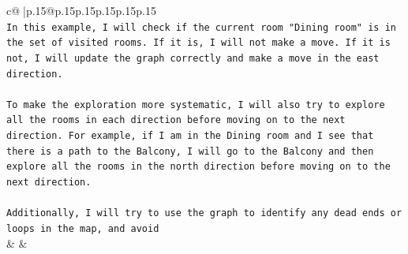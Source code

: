\documentclass{article}
\begin{document}
{\begin{supertabular}{c@{$\;$}|p{.15\linewidth}@{}p{.15\linewidth}p{.15\linewidth}p{.15\linewidth}p{.15\linewidth}p{.15\linewidth}}
{{{\\ 
\texttt{In this example, I will check if the current room "Dining room" is in the set of visited rooms. If it is, I will not make a move. If it is not, I will update the graph correctly and make a move in the east direction.} \\
\\ 
\texttt{To make the exploration more systematic, I will also try to explore all the rooms in each direction before moving on to the next direction. For example, if I am in the Dining room and I see that there is a path to the Balcony, I will go to the Balcony and then explore all the rooms in the north direction before moving on to the next direction.} \\
\\ 
\texttt{Additionally, I will try to use the graph to identify any dead ends or loops in the map, and avoid} \\
            }
        }
    }
    & & \\ \\

\end{supertabular}
}
\end{document}
